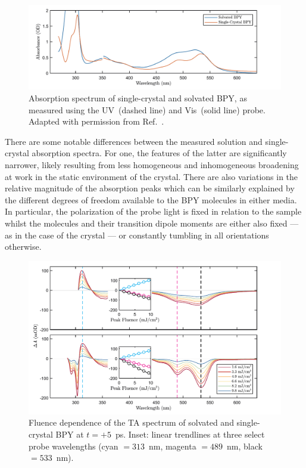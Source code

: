 \begin{figure}[ht!]
  \centering
  \includegraphics[width = \textwidth]{Figures/fig_BPY_data_linabs.pdf}
  \caption[Absorption spectrum of single-crystal and solvated BPY.]{
    Absorption spectrum of single-crystal and solvated BPY,
    as measured using the UV~(dashed line) and Vis~(solid line) probe.
    Adapted with permission from Ref.~\cite{Ryan-thesis}.
  }
  \label{fig: BPY-data-linabs}
\end{figure}

There are some notable differences between the measured solution and single-crystal
absorption spectra.
%
For one, the features of the latter are significantly narrower,
likely resulting from less homogeneous and inhomogeneous broadening at work
in the static environment of the crystal.
%
There are also variations in the relative magnitude of the absorption peaks
which can be similarly explained by the different degrees of freedom
available to the BPY molecules in either media.
In particular, the polarization of the probe light is fixed in relation to the sample
whilst the molecules and their transition dipole moments are either also fixed
--- as in the case of the crystal --- or constantly tumbling in all orientations otherwise.

\begin{figure}[ht!]
  \centering
  \includegraphics[width = \textwidth]{Figures/fig_BPY_data_fluence.pdf}
  \caption[Fluence dependence of single-crystal BPY.]{
    Fluence dependence of the TA spectrum of solvated and single-crystal BPY at $t = +5$~ps.
    Inset: linear trendlines at three select probe wavelengths
    (cyan $= 313$~nm, magenta $= 489$~nm, black $= 533$~nm).
  }
  \label{fig: BPY-data-fluence}
\end{figure}

